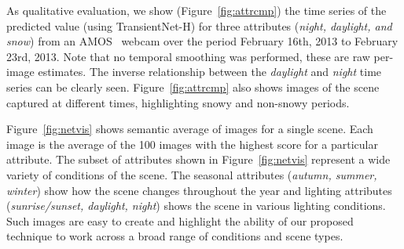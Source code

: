 \documentclass[10pt,twocolumn,letterpaper]{article}
\newcommand{\todo}[1]{\textcolor{red}{todo: {\em #1}}}
\newcommand{\figref}[1]{Figure~\ref{fig:#1}}
\begin{document}

As qualitative evaluation, we show (\figref{attrcmp}) the time series
of the predicted value (using TransientNet-H) for three attributes
(\textit{night, daylight, and snow}) from an AMOS~\cite{jacobs07amos}
webcam over the period February 16th, 2013 to February 23rd, 2013.
Note that no temporal smoothing was performed, these are raw per-image
estimates.  The inverse relationship between the \textit{daylight} and
\textit{night} time series can be clearly seen.  \figref{attrcmp} also
shows images of the scene captured at different times, highlighting
snowy and non-snowy periods.

\figref{netvis} shows semantic average of images for a single scene.
Each image is the average of the 100 images with the highest score for
a particular attribute.  The subset of attributes shown in
\figref{netvis} represent a wide variety of conditions of the scene.
The seasonal attributes (\textit{autumn, summer, winter}) show how the
scene changes throughout the year and lighting attributes
(\textit{sunrise/sunset, daylight, night}) shows the scene in various
lighting conditions.  
Such images are easy to create and highlight the ability of our
proposed technique to work across a broad range of conditions and
scene types. 



%
\end{document}
